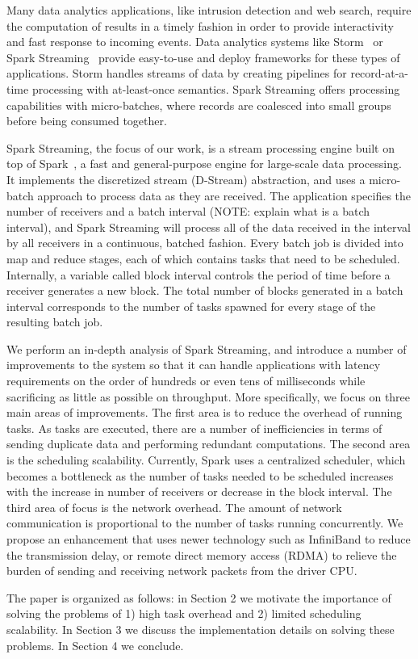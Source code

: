 \noindent

Many data analytics applications, like intrusion detection and web search, require the computation of results in a timely fashion in order to provide interactivity and fast response to incoming events.
Data analytics systems like Storm~\cite{Storm} or Spark Streaming~\cite{SparkStreaming} provide easy-to-use and deploy frameworks for these types of applications. Storm handles streams of data by creating pipelines for record-at-a-time processing with at-least-once semantics. Spark Streaming offers processing capabilities with micro-batches, where records are coalesced into small groups before being consumed together.

%
%
Spark Streaming, the focus of our work, is a stream processing engine built on top of Spark~\cite{Spark}, a fast and general-purpose engine for large-scale data processing. It implements the discretized stream (D-Stream) abstraction, and uses a micro-batch approach to process data as they are received. The application specifies the number of receivers and a batch interval (NOTE: explain what is a batch interval), and Spark Streaming will process all of the data received in the interval by all receivers in a continuous, batched fashion. Every batch job is divided into map and reduce stages, each of which contains tasks that need to be scheduled. Internally, a variable called block interval controls the period of time before a receiver generates a new block. The total number of blocks generated in a batch interval corresponds to the number of tasks spawned for every stage of the resulting batch job.

We perform an in-depth analysis of Spark Streaming, and introduce a number of improvements to the system so that it can handle applications with latency requirements on the order of hundreds or even tens of milliseconds while sacrificing as little as possible on throughput. More specifically, we focus on three main areas of improvements. The first area is to reduce the overhead of running tasks. As tasks are executed, there are a number of inefficiencies in terms of sending duplicate data and performing redundant computations. The second area is the scheduling scalability. Currently, Spark uses a centralized scheduler, which becomes a bottleneck as the number of tasks needed to be scheduled increases with the increase in number of receivers or decrease in the block interval. The third area of focus is the network overhead. The amount of network communication is proportional to the number of tasks running concurrently. We propose an enhancement that uses newer technology such as InfiniBand to reduce the transmission delay, or remote direct memory access (RDMA) to relieve the burden of sending and receiving network packets from the driver CPU.

The paper is organized as follows: in Section 2 we motivate the importance of solving the problems of 1) high task overhead and 2) limited scheduling scalability. In Section 3 we discuss the implementation details on solving these problems. In Section 4 we conclude.

